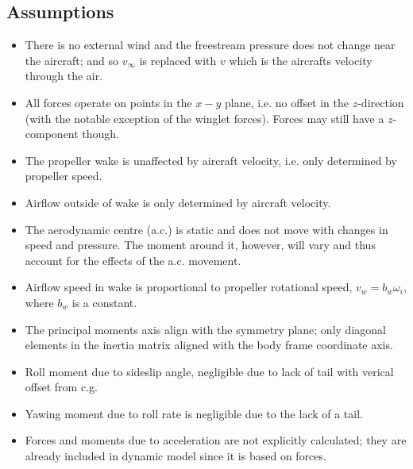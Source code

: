 \subsection{Assumptions}

\begin{itemize}
    \item There is no external wind and the freestream pressure does not change near the aircraft; and so $v_{\infty}$ is replaced with $v$ which is the aircrafts velocity through the air.

    \item All forces operate on points in the $x-y$ plane, i.e. no offset in the $z$-direction (with the notable exception of the winglet forces). Forces may still have a $z$-component though.

    \item The propeller wake is unaffected by aircraft velocity, i.e. only determined by propeller speed.

    \item Airflow outside of wake is only determined by aircraft velocity.

    \item The aerodynamic centre (a.c.) is static and does not move with changes in speed and pressure. The moment around it, however, will vary and thus account for the effects of the a.c. movement.

    \item Airflow speed in wake is proportional to propeller rotational speed, $v_w = b_w \omega_i$, where $b_w$ is a constant.

    \item The principal moments axis align with the symmetry plane; only diagonal elements in the inertia matrix aligned with the body frame coordinate axis.

    \item Roll moment due to sideslip angle, negligible due to lack of tail with verical offset from c.g.

    \item Yawing moment due to roll rate is negligible due to the lack of a tail.

    \item Forces and moments due to acceleration are not explicitly calculated; they are already included in  dynamic model since it is based on forces.

\end{itemize}